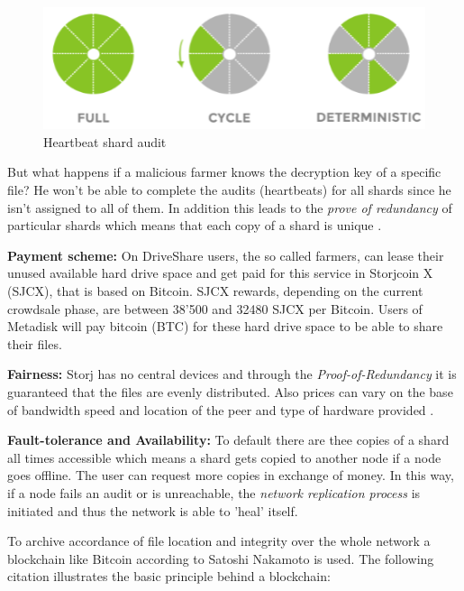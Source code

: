 	\begin{figure}[ht]
		\begin{center}
		\includegraphics[scale=0.8]{Talk5/storj_heartbeat.PNG}
		\end{center}
		\caption{Heartbeat shard audit \cite{storj:PDF}}
		\label{storj_heartbeat}
	\end{figure}

But what happens if a malicious farmer knows the decryption key of a specific file? He won't be able to complete the audits (heartbeats) for all shards since he isn't assigned to all of them. In addition this leads to the \textit{prove of redundancy} of particular shards which means that each copy of a shard is unique \cite{storj:PDF}.

\textbf{Payment scheme:} On DriveShare users, the so called farmers, can lease their unused available hard drive space and get paid for this service in Storjcoin X (SJCX), that is based on Bitcoin. SJCX rewards, depending on the current crowdsale phase, are between 38'500 and 32480 SJCX per Bitcoin\cite{storj:crowdsale}. Users of Metadisk will pay bitcoin (BTC) for these hard drive space to be able to share their files.

\textbf{Fairness:} Storj has no central devices and through the \textit{Proof-of-Redundancy} it is guaranteed that the files are evenly distributed. Also prices can vary on the base of bandwidth speed and location of the peer and type of hardware provided \cite{storj:PDF}.

\textbf{Fault-tolerance and Availability:} To default there are thee copies of a shard all times accessible which means a shard gets copied to another node if a node goes offline. The user can request more copies in exchange of money. In this way, if a node fails an audit or is unreachable, the \textit{network replication process} is initiated and thus the network is able to 'heal' itself.

To archive accordance of file location and integrity over the whole network a blockchain like Bitcoin according to Satoshi Nakamoto \cite{bitcoin} is used. The following citation illustrates the basic principle behind a blockchain:

